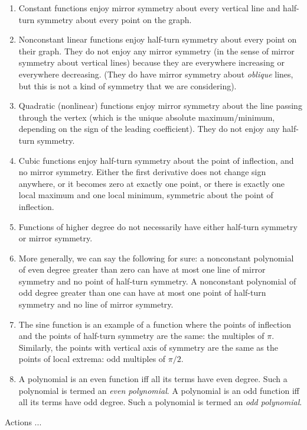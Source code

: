 \documentclass[10pt]{amsart}
\begin{document}
\begin{enumerate}
\item Constant functions enjoy mirror symmetry about every vertical
  line and half-turn symmetry about every point on the graph.
\item Nonconstant linear functions enjoy half-turn symmetry about
  every point on their graph. They do not enjoy any mirror symmetry
  (in the sense of mirror symmetry about vertical lines) because they
  are everywhere increasing or everywhere decreasing. (They do have
  mirror symmetry about {\em oblique} lines, but this is not a kind of
  symmetry that we are considering).
\item Quadratic (nonlinear) functions enjoy mirror symmetry about the
  line passing through the vertex (which is the unique absolute
  maximum/minimum, depending on the sign of the leading
  coefficient). They do not enjoy any half-turn symmetry.
\item Cubic functions enjoy half-turn symmetry about the point of
  inflection, and no mirror symmetry. Either the first derivative does
  not change sign anywhere, or it becomes zero at exactly one point,
  or there is exactly one local maximum and one local minimum,
  symmetric about the point of inflection.
\item Functions of higher degree do not necessarily have either
  half-turn symmetry or mirror symmetry.
\item More generally, we can say the following for sure: a nonconstant
  polynomial of even degree greater than zero can have at most one
  line of mirror symmetry and no point of half-turn symmetry. A
  nonconstant polynomial of odd degree greater than one can have at
  most one point of half-turn symmetry and no line of mirror symmetry.
\item The sine function is an example of a function where the points
  of inflection and the points of half-turn symmetry are the same: the
  multiples of $\pi$. Similarly, the points with vertical axis of
  symmetry are the same as the points of local extrema: odd multiples
  of $\pi/2$.
\item A polynomial is an even function iff all its terms have even
  degree. Such a polynomial is termed an {\em even polynomial}. A
  polynomial is an odd function iff all its terms have odd
  degree. Such a polynomial is termed an {\em odd polynomial}.
\end{enumerate}

Actions ...
\end{document}
